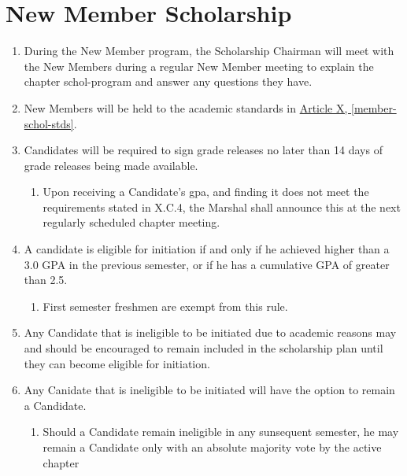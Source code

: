 \section{New Member Scholarship}
	\begin{enumerate}
		\item During the New Member program, the Scholarship Chairman will meet with the New Members during a regular New Member meeting to explain the chapter \Gls{schol-program} and answer any questions they have.
		
		\item New Members will be held to the academic standards in \hyperref[member-schol-stds]{Article X, \autoref*{member-schol-stds}}.

		\item Candidates will be required to sign grade releases no later than 14 days of grade releases being made available.

		\begin{enumerate}
			\item Upon receiving a Candidate's \gls{gpa}, and finding it does not meet the requirements stated in X.C.4, the Marshal shall announce this at the next regularly scheduled chapter meeting.
		\end{enumerate}
		
		\item A candidate is eligible for initiation if and only if he achieved higher than a 3.0 GPA in the previous semester, or if he has a cumulative GPA of greater than 2.5.
		
		\begin{enumerate}
			\item First semester freshmen are exempt from this rule.
		\end{enumerate}
		
		\item Any Candidate that is ineligible to be initiated due to academic reasons may and should be encouraged to remain included in the scholarship plan until they can become eligible for initiation.

		\item Any Canidate that is ineligible to be initiated will have the option to remain a Candidate.

		\begin{enumerate}
			\item Should a Candidate remain ineligible in any sunsequent semester, he may remain a Candidate only with an absolute majority vote by the active chapter
		\end{enumerate}

	\end{enumerate}

